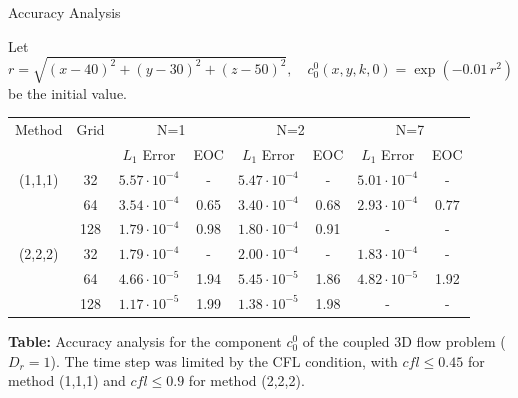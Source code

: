 
\begin{frame}{Accuracy Analysis}
	\scriptsize
	
	Let 
	\[
	r = \sqrt{(x-40)^2+(y-30)^2+(z-50)^2}, \quad
	c^0_0(x, y, k, 0) = \exp(-0.01 \, r^2)
	\] 
	be the initial value.
	
	\medskip
	\centering
	\begin{tabular}{|c|c|c|c|c|c|c|c|}
		\hline
		Method & Grid & \multicolumn{2}{c|}{N=1} & \multicolumn{2}{c|}{N=2} & \multicolumn{2}{c|}{N=7} \\
		\cline{3-8}
		&  & $L_1$ Error & EOC & $L_1$ Error & EOC & $L_1$ Error & EOC \\
		\hline
		(1,1,1) & 32  & $5.57\cdot10^{-4}$ & -    & $5.47\cdot10^{-4}$ & -    & $5.01 \cdot10^{-4} $ & - \\
		& 64  & $3.54\cdot10^{-4}$ & 0.65 & $3.40\cdot10^{-4}$ & 0.68 & $2.93\cdot10^{-4}$ & $0.77$ \\
		& 128 & $1.79\cdot10^{-4}$ & 0.98 & $1.80\cdot10^{-4}$ & 0.91 & - & - \\
		\hline
		(2,2,2) & 32  & $1.79\cdot10^{-4}$ & -    & $2.00\cdot10^{-4}$ & -    & $1.83\cdot10^{-4}$ & - \\
		& 64  & $4.66\cdot10^{-5}$ & 1.94 & $5.45\cdot10^{-5}$ & 1.86 & $4.82\cdot10^{-5}$ & 1.92 \\
		& 128 & $1.17\cdot10^{-5}$ & 1.99 & $1.38\cdot10^{-5}$ & 1.98 & - & - \\
		\hline
	\end{tabular}
	
	\vspace{0.5em}
    \footnotesize{
	\textbf{Table:} Accuracy analysis for the component $c^0_0$ of the coupled 3D flow problem ($D_r=1$). The time step was limited by the CFL condition, with $cfl \le 0.45$ for method (1,1,1) and $cfl \le 0.9$ for method (2,2,2).  
}
\end{frame}



